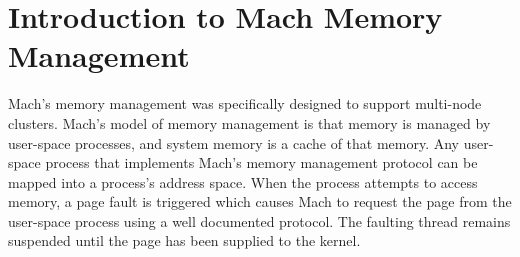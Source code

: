 \documentclass{article}
\begin{document}
\section{Introduction to Mach Memory Management}

Mach's memory management was specifically designed to support
multi-node clusters.  Mach's model of memory management is that memory
is managed by user-space processes, and system memory is a cache of
that memory.  Any user-space process that implements Mach's memory
management protocol can be mapped into a process's address space.
When the process attempts to access memory, a page fault is triggered
which causes Mach to request the page from the user-space process
using a well documented protocol.  The faulting thread remains
suspended until the page has been supplied to the kernel.
\end{document}
